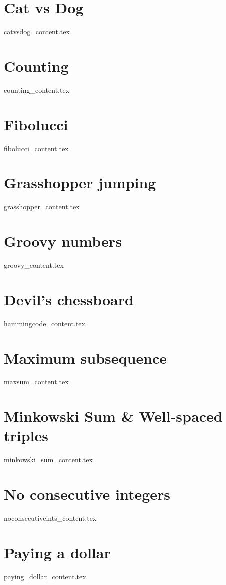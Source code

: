 \documentclass[justified, openany]{tufte-book}
\theoremstyle{plain}%
\theoremstyle{definition}
\theoremstyle{remark}
\begin{document}
\chapter{Cat vs Dog}
{catvsdog_content.tex}

\clearpage
\chapter{Counting}
{counting_content.tex}

\clearpage
\chapter{Fibolucci}
{fibolucci_content.tex}

\clearpage
\chapter{Grasshopper jumping}
{grasshopper_content.tex}

\clearpage
\chapter{Groovy numbers}
{groovy_content.tex}

\clearpage
\chapter{Devil's chessboard}
{hammingcode_content.tex}

\clearpage
\chapter{Maximum subsequence}
{maxsum_content.tex}

\clearpage
\chapter{Minkowski Sum \& Well-spaced triples}
{minkowski_sum_content.tex}

\clearpage
\chapter{No consecutive integers}
{noconsecutiveints_content.tex}

\clearpage
\chapter{Paying a dollar}
{paying_dollar_content.tex}
\end{document}
